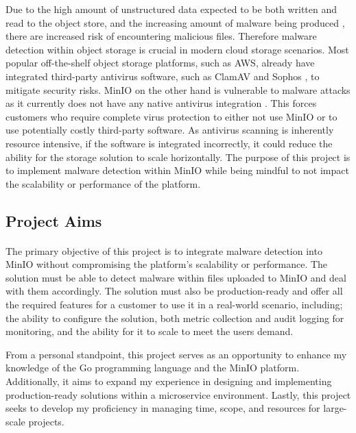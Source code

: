 \documentclass[12pt, conference, final, a4paper, onecolumn, compsoc]{IEEEtran}
\begin{document}
Due to the high amount of unstructured data expected to be both written and read
to the object store, and the increasing amount of malware being produced
\citep{sophos}, there are increased risk of encountering malicious files.
Therefore malware detection within object storage is crucial in modern cloud
storage scenarios. Most popular off-the-shelf object storage platforms, such as
AWS, already have integrated third-party antivirus software, such as ClamAV and
Sophos \citep{amazon-md}, to mitigate security risks. MinIO on the other hand is
vulnerable to malware attacks as it currently does not have any native antivirus
integration \citep{minio}. This forces customers who require complete virus protection to
either not use MinIO or to use potentially costly third-party software. As
antivirus scanning is inherently resource intensive, if the software is
integrated incorrectly, it could reduce the ability for the storage solution to
scale horizontally. The purpose of this project is to implement malware
detection within MinIO while being mindful to not impact the scalability or
performance of the platform.

\subsection{Project Aims} %
\paragraph{}

The primary objective of this project is to integrate malware detection into
MinIO without compromising the platform's scalability or performance. The
solution must be able to detect malware within files uploaded to MinIO and deal
with them accordingly. The solution must also be production-ready and offer all
the required features for a customer to use it in a real-world scenario,
including; the ability to configure the solution, both metric collection and
audit logging for monitoring, and the ability for it to scale to meet the users
demand.

From a personal standpoint, this project serves as an opportunity to enhance my
knowledge of the Go programming language and the MinIO platform. Additionally,
it aims to expand my experience in designing and implementing production-ready
solutions within a microservice environment. Lastly, this project seeks to
develop my proficiency in managing time, scope, and resources for large-scale
projects.
\end{document}
